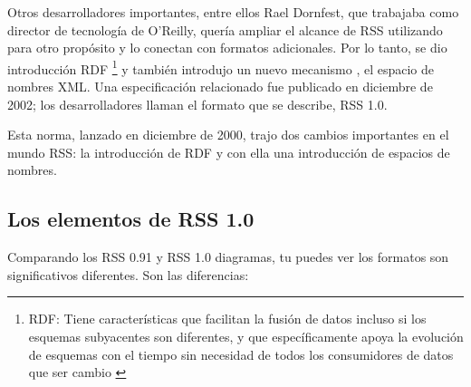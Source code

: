Otros desarrolladores importantes, entre ellos Rael Dornfest, que 
trabajaba como director de tecnolog\'{i}a de O'Reilly, quer\'{i}a ampliar el 
alcance de RSS utilizando para otro prop\'{o}sito y lo conectan con formatos
adicionales. Por lo tanto, se dio introducci\'{o}n RDF \footnote{RDF: Tiene 
caracter\'{i}sticas que facilitan la fusi\'{o}n de datos incluso si los 
esquemas subyacentes son diferentes, y que espec\'{i}ficamente apoya la 
evoluci\'{o}n de esquemas con el tiempo sin necesidad de todos los consumidores
de datos que ser cambio \cite{rdf}}  y tambi\'{e}n introdujo un nuevo mecanismo
, el espacio de nombres XML. Una especificaci\'{o}n relacionado fue publicado 
en diciembre de 2002; los desarrolladores llaman el formato que se describe, 
RSS 1.0.\cite{johnson2006rss}

Esta norma, lanzado en diciembre de 2000, trajo dos cambios importantes en el 
mundo RSS: la introducci\'{o}n de RDF y con ella una introducci\'{o}n de espacios
de nombres.\cite{hammersley2005developing}
 
\subsection{Los elementos de RSS 1.0}

Comparando los RSS 0.91 y RSS 1.0 diagramas, tu puedes ver los formatos son significativos
diferentes. Son las diferencias:

